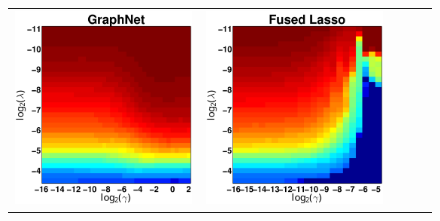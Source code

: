 \begin{figure}[ptbh]
\begin{tabular}{ccccc}
	\includegraphics[height=\imheight,width=\imwidth]{sim_gridsearch_gnet_nnz100.pdf} &
	\includegraphics[height=\imheight,width=\imwidth]{sim_gridsearch_flas_nnz100.pdf} &

\end{tabular}
\end{figure}
